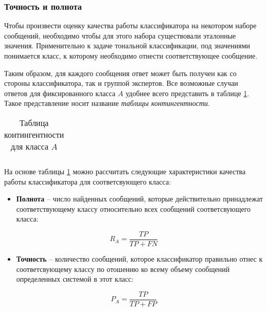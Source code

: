         \subsubsection{Точность и полнота}
    Чтобы произвести оценку качества работы классификатора на некотором наборе
    сообщений, необходимо чтобы для этого набора существовали эталонные
    значения. Применительно к задаче тональной классификации, под значениями
    понимается класс, к которому необходимо отнести соответствующее сообщение.

    Таким образом, для каждого сообщения ответ может быть получен как со стороны
    классификатора, так и группой экспертов. Все возможные случаи ответов
    для фиксированного класса $A$ удобнее всего представить в таблице
    \ref{table:contingent}. Такое представление носит название
    {\it таблицы контингентности}.

    \begin{table}[ht]
        \centering
        \caption{Таблица контингентности для класса $A$}
        \label{table:contingent}
        \begin{tabular}{|l|}
            \hline
             \\ \hline
         \end{tabular}
     \end{table}

     На основе таблицы \ref{table:contingent} можно рассчитать следующие
     характеристики качества работы классификатора для соответсвующего класса:
    \begin{itemize}
        \item {\bf Полнота} -- число найденных сообщений, которые
            действительно принадлежат соответствующему классу относительно всех
            сообщений соответсвующего класса:

            \begin{equation}
                \label{eq:recall}
                R_A = \dfrac{TP}{TP + FN} \hspace{20pt}
            \end{equation}

        \item {\bf Точность} -- количество сообщений, которое
            классификатор правильно отнес к соответсвующему классу по отошению
            ко всему объему сообщений определенных системой в этот класс:

            \begin{equation}
                \label{eq:precision}
                P_A = \dfrac{TP}{TP + FP} \hspace{20pt}
            \end{equation}
    \end{itemize}

